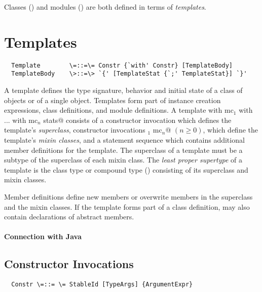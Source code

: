 \documentclass[11pt]{report}
\begin{document}
Classes () and modules
() are both defined in terms of {\em templates}.

\section{Templates}
\label{sec:templates}

\syntax\begin{verbatim}
  Template        \=::=\= Constr {`with' Constr} [TemplateBody]
  TemplateBody    \>::=\> `{' [TemplateStat {`;' TemplateStat}] `}'
\end{verbatim}

A template defines the type signature, behavior and initial state of a
class of objects or of a single object. Templates form part of
instance creation expressions, class definitions, and module
definitions.  A template
\verb@sc with mc$_1$ with ... with mc$_n$ {stats}@ consists of a
constructor invocation \verb@sc@ which defines the template's {\em
superclass}, constructor invocations \verb@mc$_1$ \commadots mc$_n$@
$(n \geq 0)$, which define the template's {\em mixin classes}, and a
statement sequence \verb@stats@ which contains additional member
definitions for the template.  The superclass of a template must be a
subtype of the superclass of each mixin class.  The {\em least proper
supertype} of a template is the class type or compound type
() consisting of its superclass and mixin
classes.

Member definitions define new members or overwrite members in the
superclass and the mixin classes.  If the template forms part of a
class definition, \verb@stats@ may also contain declarations of abstract
members. 

\paragraph{Connection with Java} 

\subsection{Constructor Invocations}
\label{sec:constr-invoke}
\syntax\begin{verbatim}
  Constr \=::= \= StableId [TypeArgs] {ArgumentExpr}
\end{verbatim}
\end{document}
